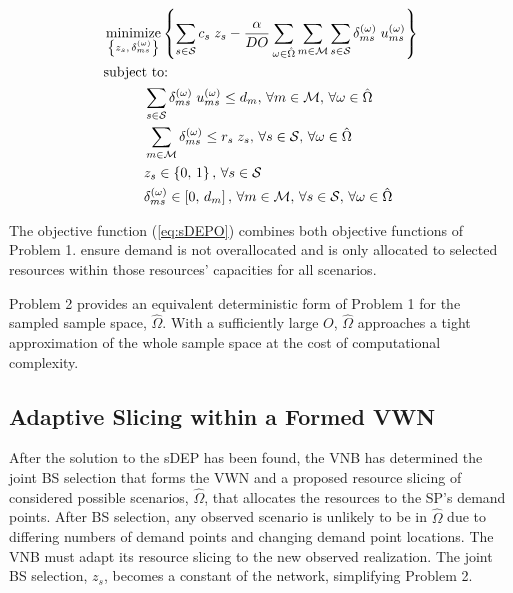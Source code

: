 \documentclass[conference]{IEEEtran}
\DeclareMathOperator*{\argmin}{minimize}
\begin{document}
\begin{tcolorbox}[floatplacement = !ht, float, title = Problem 2: Sampled DEP (sDEP)]
\begin{align}
& \argmin_{\left\{ z_s,\, \delta_{ms}^{\left( \omega \right)} \right\}} \left\{ \sum_{s \in \mathcal{S}} c_s \; z_s - \frac{\alpha}{DO} \sum_{\omega \in \hat{\Omega}} \sum_{m \in \mathcal{M}} \sum_{s \in \mathcal{S}} \delta_{ms}^{\left( \omega \right)} \; u_{ms}^{\left( \omega \right)} \right\} \label{eq:sDEPO} \\
& \text{subject to:}  \nonumber \\
& \hspace{0.4in} \sum_{s \in \mathcal{S}} \delta_{ms}^{\left( \omega \right)} \; u_{ms}^{\left( \omega \right)} \leq d_m,\, \forall m \in \mathcal{M},\, \forall \omega \in \hat{\Omega} \label{eq:sDEPC1} \\
& \hspace{0.4in} \sum_{m \in \mathcal{M}} \delta_{ms}^{\left( \omega \right)} \leq r_s \; z_s,\, \forall s \in \mathcal{S},\, \forall \omega \in \hat{\Omega} \label{eq:sDEPC2} \\
& \hspace{0.4in} z_s \in \left\{ 0,\, 1 \right\},\, \forall s \in \mathcal{S} \label{eq:sDEPC3} \\
& \hspace{0.4in} \delta_{ms}^{\left( \omega \right)} \in \left[ 0,\, d_m \right],\, \forall m \in \mathcal{M},\, \forall s \in \mathcal{S},\, \forall \omega \in \hat{\Omega} \label{eq:sDEPC4}
\end{align}
\end{tcolorbox}

The objective function (\cref{eq:sDEPO}) combines both objective functions of Problem 1.   ensure demand is not overallocated and is only allocated to selected resources within those resources' capacities for all scenarios.

Problem 2 provides an equivalent deterministic form of Problem 1 for the sampled sample space, $\hat{\Omega}$.  With a sufficiently large $O$, $\hat{\Omega}$ approaches a tight approximation of the whole sample space at the cost of computational complexity.

\subsection{Adaptive Slicing within a Formed VWN} \label{subsec:slice}

After the solution to the sDEP has been found, the VNB has determined the joint BS selection that forms the VWN and a proposed resource slicing of considered possible scenarios, $\hat{\Omega}$, that allocates the resources to the SP's demand points.  After BS selection, any observed scenario is unlikely to be in $\hat{\Omega}$ due to differing numbers of demand points and changing demand point locations.  The VNB must adapt its resource slicing to the new observed realization.  The joint BS selection, $z_s$, becomes a constant of the network, simplifying Problem 2.
\end{document}
